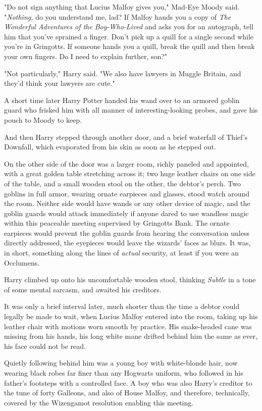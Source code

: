 "Do not sign anything that Lucius Malfoy gives you," Mad-Eye Moody said.
"\emph{Nothing,} do you understand me, lad? If Malfoy hands you a copy of
\emph{The Wonderful Adventures of the Boy-Who-Lived} and asks you for an
autograph, tell him that you've sprained a finger. Don't pick up a quill for a
single second while you're in Gringotts. If someone hands you a quill, break
the quill and then break your own fingers. Do I need to explain further, son?"

"Not particularly," Harry said. "We also have lawyers in Muggle Britain, and
they'd think your lawyers are cute."

A short time later Harry Potter handed his wand over to an armored goblin guard
who frisked him with all manner of interesting-looking probes, and gave his
pouch to Moody to keep.

And then Harry stepped through another door, and a brief waterfall of Thief's
Downfall, which evaporated from his skin as soon as he stepped out.

On the other side of the door was a larger room, richly paneled and appointed,
with a great golden table stretching across it; two huge leather chairs on one
side of the table, and a small wooden stool on the other, the debtor's perch.
Two goblins in full armor, wearing ornate earpieces and glasses, stood watch
around the room. Neither side would have wands or any other device of magic,
and the goblin guards would attack immediately if anyone dared to use wandless
magic within this peaceable meeting supervised by Gringotts Bank. The ornate
earpieces would prevent the goblin guards from hearing the conversation unless
directly addressed, the eyepieces would leave the wizards' faces as blurs. It
was, in short, something along the lines of \emph{actual} security, at least if
you were an Occlumens.

Harry climbed up onto his uncomfortable wooden stool, thinking \emph{Subtle} in
a tone of some mental sarcasm, and awaited his creditors.

It was only a brief interval later, much shorter than the time a debtor could
legally be made to wait, when Lucius Malfoy entered into the room, taking up
his leather chair with motions worn smooth by practice. His snake-headed cane
was missing from his hands, his long white mane drifted behind him the same as
ever, his face could not be read.

Quietly following behind him was a young boy with white-blonde hair, now
wearing black robes far finer than any Hogwarts uniform, who followed in his
father's footsteps with a controlled face. A boy who was also Harry's creditor
to the tune of forty Galleons, and also of House Malfoy, and therefore,
technically, covered by the Wizengamot resolution enabling this meeting.

